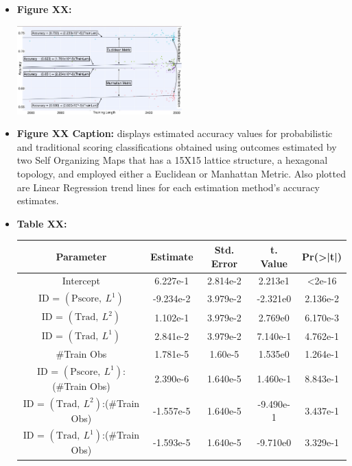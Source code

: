 \documentclass[12pt,]{article}
\begin{document}
\begin{itemize}
\item
  \textbf{Figure XX:}

  \begin{center}
  \includegraphics[width=0.5\textwidth]{SomResultsGraph.jpeg}
  \end{center}
\item
  \textbf{Figure XX Caption:} displays estimated accuracy values for
  probabilistic and traditional scoring classifications obtained using
  outcomes estimated by two Self Organizing Maps that has a 15X15
  lattice structure, a hexagonal topology, and employed either a
  Euclidean or Manhattan Metric. Also plotted are Linear Regression
  trend lines for each estimation method's accuracy estimates.
\item
  \textbf{Table XX:}

  \begin{center}
  \begin{tabular}{|c|c|c|c|c|}
  \hline
  Parameter     & Estimate  & Std. Error & t. Value  & Pr(>|t|) \\
  \hline
  \hline
  Intercept    &  6.227e-1 &  2.814e-2  &  2.213e1  & <2e-16   \\                             
  \hline
  ID = $\left(\text{Pscore}, \ L^{1}  \right)$               & -9.234e-2 &  3.979e-2  & -2.321e0  & 2.136e-2 \\
  \hline
  ID = $\left(\text{Trad}, \ L^{2}   \right)$               & 1.102e-1 &  3.979e-2  & 2.769e0  & 6.170e-3 \\
  \hline
  ID = $\left(\text{Trad}, \ L^{1}   \right)$               & 2.841e-2 &  3.979e-2  & 7.140e-1  & 4.762e-1 \\
  \hline
  \#Train Obs  &  1.781e-5 &  1.60e-5  &  1.535e0  & 1.264e-1 \\
  \hline
  ID = $\left(\text{Pscore}, \ L^{1}  \right)$:(\#Train Obs) &  2.390e-6 &  1.640e-5  &  1.460e-1 & 8.843e-1 \\
  \hline
  ID = $\left(\text{Trad}, \ L^{2}   \right)$:(\#Train Obs) &  -1.557e-5 &  1.640e-5  &  -9.490e-1 & 3.437e-1 \\
  \hline
  ID = $\left(\text{Trad}, \ L^{1}   \right)$:(\#Train Obs) &  -1.593e-5 &  1.640e-5  &  -9.710e0 & 3.329e-1 \\
  \hline
  \end{tabular}
  \end{center}


\end{itemize}
\end{document}
